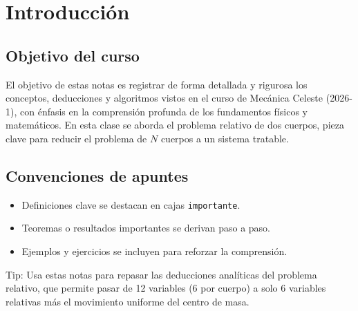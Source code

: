 \chapter{Introducción}

\section{Objetivo del curso}
El objetivo de estas notas es registrar de forma detallada y rigurosa los conceptos, deducciones y algoritmos vistos en el curso de Mecánica Celeste (2026-1), con énfasis en la comprensión profunda de los fundamentos físicos y matemáticos. En esta clase se aborda el problema relativo de dos cuerpos, pieza clave para reducir el problema de \(N\) cuerpos a un sistema tratable.

\section{Convenciones de apuntes}
\begin{itemize}[leftmargin=2em]
    \item Definiciones clave se destacan en cajas \texttt{importante}.
    \item Teoremas o resultados importantes se derivan paso a paso.
    \item Ejemplos y ejercicios se incluyen para reforzar la comprensión.
\end{itemize}

\begin{importante}
Tip: Usa estas notas para repasar las deducciones analíticas del problema relativo, que permite pasar de 12 variables (6 por cuerpo) a solo 6 variables relativas más el movimiento uniforme del centro de masa.
\end{importante}

